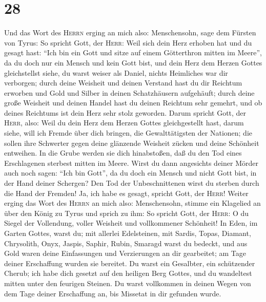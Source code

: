 \hypertarget{section-27}{%
\section{28}\label{section-27}}

 Und das Wort des \textsc{Herrn} erging an mich also:
 Menschensohn, sage dem Fürsten von Tyrus: So spricht
Gott, der \textsc{Herr}: Weil sich dein Herz erhoben hat und du gesagt
hast: ``Ich bin ein Gott und sitze auf einem Götterthron mitten im
Meere'', da du doch nur ein Mensch und kein Gott bist, und dein Herz dem
Herzen Gottes gleichstellst  siehe, du warst weiser als
Daniel, nichts Heimliches war dir verborgen;  durch deine
Weisheit und deinen Verstand hast du dir Reichtum erworben und Gold und
Silber in deinen Schatzhäusern aufgehäuft;  durch deine
große Weisheit und deinen Handel hast du deinen Reichtum sehr gemehrt,
und ob deines Reichtums ist dein Herz sehr stolz geworden.
 Darum spricht Gott, der \textsc{Herr}, also: Weil du dein
Herz dem Herzen Gottes gleichgestellt hast,  darum siehe,
will ich Fremde über dich bringen, die Gewalttätigsten der Nationen; die
sollen ihre Schwerter gegen deine glänzende Weisheit zücken und deine
Schönheit entweihen.  In die Grube werden sie dich
hinabstoßen, daß du den Tod eines Erschlagenen sterbest mitten im Meere.
 Wirst du dann angesichts deiner Mörder auch noch sagen:
``Ich bin Gott'', da du doch ein Mensch und nicht Gott bist, in der Hand
deiner Schergen?  Den Tod der Unbeschnittenen wirst du
sterben durch die Hand der Fremden! Ja, ich habe es gesagt, spricht
Gott, der \textsc{Herr}!  Weiter erging das Wort des
\textsc{Herrn} an mich also:  Menschensohn, stimme ein
Klagelied an über den König zu Tyrus und sprich zu ihm: So spricht Gott,
der \textsc{Herr}: O du Siegel der Vollendung, voller Weisheit und
vollkommener Schönheit!  In Eden, im Garten Gottes, warst
du; mit allerlei Edelsteinen, mit Sardis, Topas, Diamant, Chrysolith,
Onyx, Jaspis, Saphir, Rubin, Smaragd warst du bedeckt, und aus Gold
waren deine Einfassungen und Verzierungen an dir gearbeitet; am Tage
deiner Erschaffung wurden sie bereitet.  Du warst ein
Gesalbter, ein schützender Cherub; ich habe dich gesetzt auf den
heiligen Berg Gottes, und du wandeltest mitten unter den feurigen
Steinen.  Du warst vollkommen in deinen Wegen von dem
Tage deiner Erschaffung an, bis Missetat in dir gefunden wurde.
